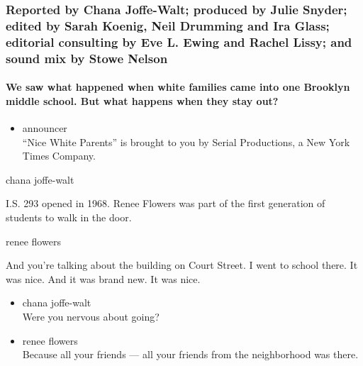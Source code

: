 \hypertarget{reported-by-chana-joffe-walt-produced-by-julie-snyder-edited-by-sarah-koenig-neil-drumming-and-ira-glass-editorial-consulting-by-eve-l-ewing-and-rachel-lissy-and-sound-mix-by-stowe-nelson-2}{%
\subsubsection{Reported by Chana Joffe-Walt; produced by Julie Snyder;
edited by Sarah Koenig, Neil Drumming and Ira Glass; editorial
consulting by Eve L. Ewing and Rachel Lissy; and sound mix by Stowe
Nelson}\label{reported-by-chana-joffe-walt-produced-by-julie-snyder-edited-by-sarah-koenig-neil-drumming-and-ira-glass-editorial-consulting-by-eve-l-ewing-and-rachel-lissy-and-sound-mix-by-stowe-nelson-2}}

\hypertarget{we-saw-what-happened-when-white-families-came-into-one-brooklyn-middle-school-but-what-happens-when-they-stay-out}{%
\paragraph{We saw what happened when white families came into one
Brooklyn middle school. But what happens when they stay
out?}\label{we-saw-what-happened-when-white-families-came-into-one-brooklyn-middle-school-but-what-happens-when-they-stay-out}}

\begin{itemize}
\tightlist
\item
  announcer\\
  ``Nice White Parents'' is brought to you by Serial Productions, a New
  York Times Company.
\end{itemize}

chana joffe-walt

I.S. 293 opened in 1968. Renee Flowers was part of the first generation
of students to walk in the door.

renee flowers

And you're talking about the building on Court Street. I went to school
there. It was nice. And it was brand new. It was nice.

\begin{itemize}
\item
  chana joffe-walt\\
  Were you nervous about going?
\item
  renee flowers\\
  Because all your friends --- all your friends from the neighborhood
  was there.
\end{itemize}

